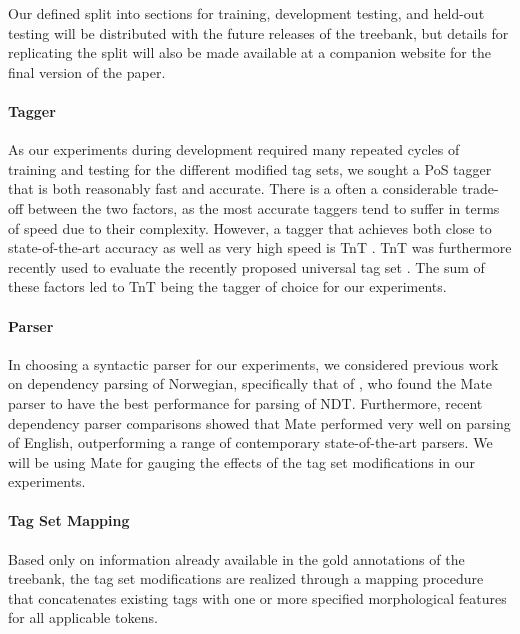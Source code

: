 \documentclass[11pt,a4paper]{article}
\begin{document}
Our defined split into sections for training, development testing, and held-out
testing will be distributed with the future releases of the treebank, but
details for replicating the split will also be made available at a companion website
for the final version of the paper.

\paragraph{Tagger}
As our experiments during development required many repeated cycles of training and
testing for the different modified tag sets, we sought a PoS tagger that is both
reasonably fast and accurate. There is a often a considerable trade-off between
the two factors, as the most accurate taggers tend to suffer in terms of speed
due to their complexity. However, a tagger that achieves both close to
state-of-the-art accuracy as well as very high speed is TnT \cite{Bra:00}. TnT
was furthermore recently used to evaluate the recently proposed universal tag
set \cite{Pet:Das:McD:12}. The sum of these factors led to TnT being the tagger
of choice for our experiments.

\paragraph{Parser}
In choosing a syntactic parser for our experiments, we considered previous work
on dependency parsing of Norwegian, specifically that of
, who found the Mate parser \cite{Boh:10} to have the
best performance for parsing of NDT. Furthermore, recent dependency parser
comparisons \cite{Cho:Tet:Ste:15} showed that Mate performed very well on
parsing of English, outperforming a range of contemporary state-of-the-art
parsers. We will be using Mate for gauging the effects of the tag set
modifications in our experiments.

\paragraph{Tag Set Mapping}
Based only on information already available in the gold annotations of the
treebank, the tag set modifications are realized through a mapping procedure that
concatenates existing tags with one or more specified morphological features for all
applicable tokens.
\end{document}
